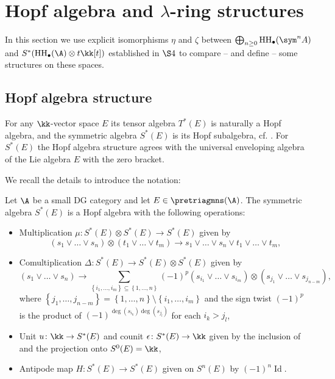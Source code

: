 \documentclass[12pt,a4paper,reqno]{amsart}
\DeclareMathOperator{\id}{Id}
\DeclareMathOperator{\hochhom}{{HH}}
\begin{document}
\section{Hopf algebra and $\lambda$-ring structures}
\label{section-hopf-algebra-and-lambda-ring-structures}

In this section we use explicit isomorphisms $\eta$ and $\zeta$
between  $\bigoplus_{n \geq 0} \hochhom_\bullet(\sym^n A)$
and $S^*(\hochhom_\bullet(\A) \otimes t \kk[t])$ established in $\S4$ 
to compare -- and define -- some structures on these spaces.  

\subsection{Hopf algebra structure}

For any $\kk$-vector space $E$ its tensor algebra $T^*(E)$ is
naturally a Hopf algebra, and the symmetric algebra $S^*(E)$
is its Hopf subalgebra, cf. \cite[\S4.0]{Sweedler-HopfAlgebras}.
For $S^*(E)$ the Hopf algebra structure agrees with the universal 
enveloping algebra of the Lie algebra $E$ with the zero bracket.

We recall the details to introduce the notation:

\begin{defn}
\label{defn-hopf-algebra-structure-on-the-symmetric-algebra}
Let $\A$ be a small DG category and let $E \in \pretriagmns(\A)$. 
The symmetric algebra $S^*(E)$ is a Hopf algebra with the following
operations:

\begin{itemize}
\item Multiplication 
$\mu\colon S^*(E) \otimes S^*(E) \rightarrow S^*(E)$ given by 
$$ (s_1 \vee \dots \vee s_n) \otimes (t_1 \vee \dots \vee t_m) 
\rightarrow s_1 \vee \dots \vee s_n \vee t_1 \vee \dots \vee t_m, $$

\item Comultiplication
$\Delta\colon S^*(E) \rightarrow S^*(E) \otimes S^*(E) $ given by 
$$ (s_1 \vee \dots \vee s_n) 
\rightarrow \sum_{
\left\{ i_1, \dots, i_m \right\} 
\subseteq \left\{ 1, \dots, n \right\} }
(-1)^{p}
(s_{i_1} \vee \dots \vee s_{i_m}) \otimes (s_{j_1} \vee \dots \vee
s_{j_{n-m}}), $$
where $\left\{ j_1, \dots, j_{n-m} \right\} = \left\{1,\dots, n\right\}
\setminus \left\{ i_1, \dots, i_m \right\}$ and the sign twist $(-1)^p$ 
is the product of $(-1)^{\deg(s_{i_k})\deg(s_{j_{l}})}$ for 
each $i_k > j_l$,

\item Unit $u\colon \kk \rightarrow S^*(E)$ and counit 
$\epsilon\colon S^*(E)\rightarrow \kk$ given by the inclusion 
of and the projection onto $S^0(E) = \kk$,

\item Antipode map $H\colon S^*(E) \rightarrow S^*(E)$ given 
on $S^n(E)$ by $(-1)^n \id$. 
\end{itemize}
\end{defn}
\end{document}
